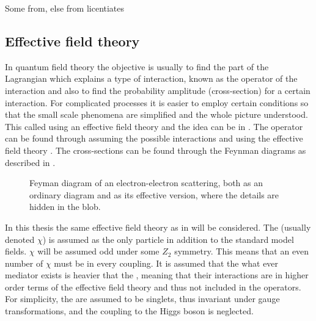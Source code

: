 Some from, else from licentiates \citep{Martin:1998,Dine:1981,Pavel:2014}

\subsection{Effective field theory}
In quantum field theory the objective is usually to find the part of the Lagrangian which explains a type of interaction, known as the operator of the interaction and also to find the probability amplitude (cross-section) for a certain interaction. For complicated processes it is easier to employ certain conditions so that the small scale phenomena are simplified and the whole picture understood. This called using an effective field theory and the idea can be in . The operator can be found through assuming the possible interactions and using the effective field theory \citep{Zee:2003}. The cross-sections can be found through the Feynman diagrams as described in . 
 \begin{figure}[!ht]
    \hfill
    \caption{Feyman diagram of an electron-electron scattering, both as an ordinary diagram and as its effective version, where the details are hidden in the blob.}
    \label{fig:feymanc}
  \end{figure}

In this thesis the same effective field theory as in \citep{82.116010,Goodman:2010} will be considered. The \abbrWIMP (usually denoted $\chi$) is assumed as the only particle in addition to the standard model fields. $\chi$ will be assumed odd under some $Z_2$ symmetry. This means that an even number of $\chi$ must be in every coupling. It is assumed that the what ever mediator exists is heavier that the \abbrWIMPS, meaning that their interactions are in higher order terms of the effective field theory and thus not included in the operators. For simplicity, the \abbrWIMPS are assumed to be \abbrSM singlets, thus invariant under \abbrSM gauge transformations, and the coupling to the Higgs boson is neglected.

